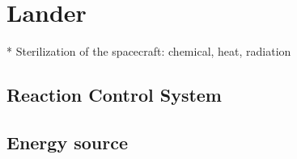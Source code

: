 \chapter{Lander}

* Sterilization of the spacecraft: chemical, heat, radiation




\section{Reaction Control System}






\section{Energy source}

